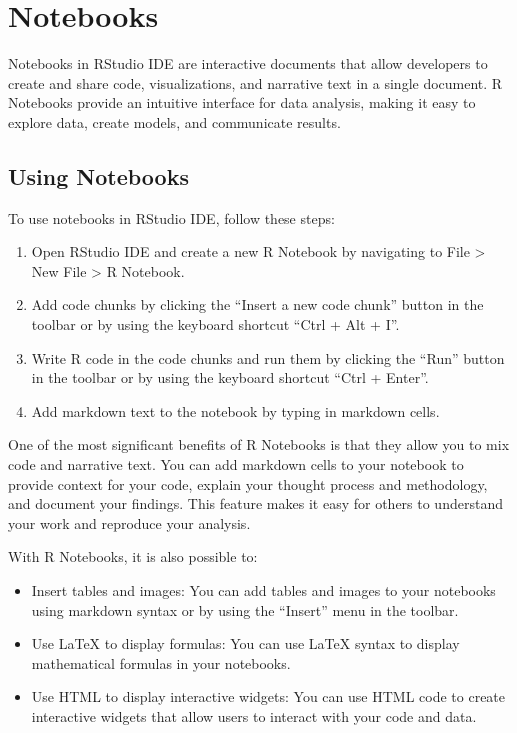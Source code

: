 \documentclass[
]{book}
\providecommand{\tightlist}{%
  \setlength{\itemsep}{0pt}\setlength{\parskip}{0pt}}
\begin{document}
\hfill\break

\hypertarget{notebooks}{%
\section{Notebooks}\label{notebooks}}

Notebooks in RStudio IDE are interactive documents that allow developers to create and share code, visualizations, and narrative text in a single document. R Notebooks provide an intuitive interface for data analysis, making it easy to explore data, create models, and communicate results.

\hypertarget{using-notebooks}{%
\subsection*{Using Notebooks}\label{using-notebooks}}

To use notebooks in RStudio IDE, follow these steps:

\begin{enumerate}
\def\labelenumi{\arabic{enumi}.}
\tightlist
\item
  Open RStudio IDE and create a new R Notebook by navigating to File \textgreater{} New File \textgreater{} R Notebook.
\item
  Add code chunks by clicking the ``Insert a new code chunk'' button in the toolbar or by using the keyboard shortcut ``Ctrl + Alt + I''.
\item
  Write R code in the code chunks and run them by clicking the ``Run'' button in the toolbar or by using the keyboard shortcut ``Ctrl + Enter''.
\item
  Add markdown text to the notebook by typing in markdown cells.
\end{enumerate}

One of the most significant benefits of R Notebooks is that they allow you to mix code and narrative text. You can add markdown cells to your notebook to provide context for your code, explain your thought process and methodology, and document your findings. This feature makes it easy for others to understand your work and reproduce your analysis.

With R Notebooks, it is also possible to:

\begin{itemize}
\tightlist
\item
  Insert tables and images: You can add tables and images to your notebooks using markdown syntax or by using the ``Insert'' menu in the toolbar.
\item
  Use LaTeX to display formulas: You can use LaTeX syntax to display mathematical formulas in your notebooks.
\item
  Use HTML to display interactive widgets: You can use HTML code to create interactive widgets that allow users to interact with your code and data.
\end{itemize}
\end{document}
